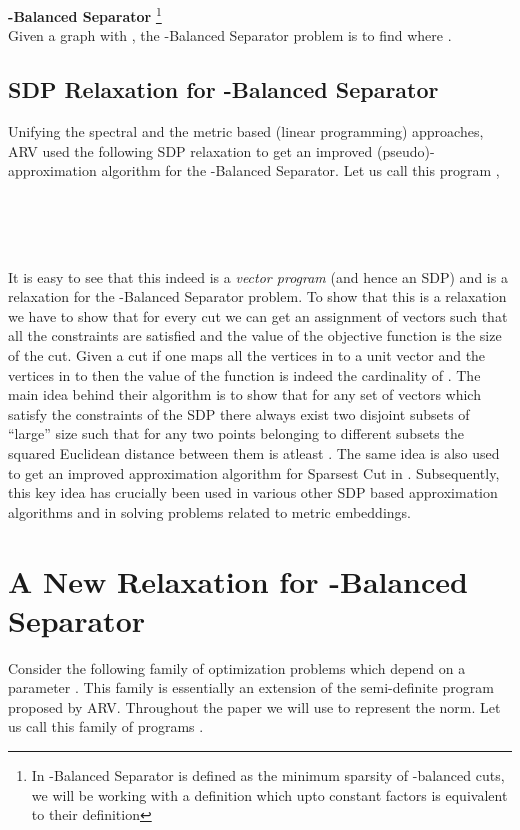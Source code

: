 \documentclass [11pt,a4paper]{article}
\begin{document}
\textbf{ -{\sc Balanced Separator}} \footnote{In \cite{ARV} -{\sc Balanced Separator} is defined as 
the minimum sparsity of -balanced cuts, we will be working with a definition which upto constant factors
is equivalent to their definition} \\
Given a graph  with , the -{\sc Balanced Separator} problem is to find  where 
.

\subsection{SDP Relaxation for {\sc -Balanced Separator}}
Unifying the spectral and the metric based (linear programming) approaches, {\sf ARV} used the following SDP
relaxation to get an improved (pseudo)-approximation algorithm
for the -{\sc Balanced Separator}. Let us call this program ,

\begin{center}
\\
\\
 \\

\end{center}

It is easy to see that this indeed is a \emph{vector program} (and hence an SDP)
and is a relaxation for the -{\sc Balanced Separator} 
problem. To show that this is a relaxation we have to show that for every cut we can get an assignment of vectors
such that all the constraints are satisfied and the value of the objective function
is the size of the cut. Given a cut  if one maps all the vertices in 
 to a unit vector  and the vertices in  to  then the value
of the function is indeed the cardinality of . 
The main idea behind their algorithm is to show that for any set of vectors which satisfy the constraints
of the SDP there always exist two disjoint subsets of ``large'' size such that for any two points belonging to 
different subsets the squared Euclidean distance between them is atleast .
The same idea is also used to get an improved approximation algorithm for {\sc Sparsest Cut} in \cite{ARV}.
Subsequently, this key idea has crucially been used in various other SDP based approximation algorithms and in 
solving problems related to metric embeddings.  

\section{A New Relaxation for -{\sc Balanced Separator}}
Consider the following family of optimization problems which depend on a parameter .
This family is essentially an extension of the semi-definite program proposed by {\sf ARV}.
Throughout the paper we will use  to represent the  norm. Let us call this 
family of programs .
\end{document}
